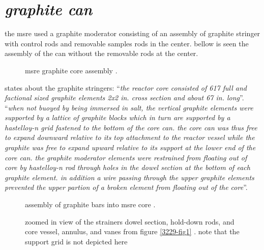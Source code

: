 \documentclass[ms,a4paper]{memoir}
\newcommand*{\mrsarchive}{../../msr-archive}%
\begin{document}
\section{\emph{graphite can}}
the msre used a graphite moderator consisting of an assembly of graphite stringer with control rods and removable samples rods in the center. bellow is seen the assembly of the can without the removable rods at the center.
\begin{figure}[H]
  \centering
  \caption{msre graphite core assembly \parencite{ornl}.}
  \label{core-assembly}
\end{figure}
\textcite[page 112 and 114]{ornl-tm-3039} states about the graphite stringers: \enquote{\textit{the reactor core consisted of 617 full and factional sized graphite elements 2x2 in. cross section and about 67 in. long}}. \enquote{\textit{when not buoyed by being immersed in salt, the vertical graphite elements were supported by a lattice of graphite blocks which in turn are supported by a hastelloy-n grid fastened to the bottom of the core can. the core can was thus free to expand downward relative to its top attachment to the reactor vessel while the graphite was free to expand upward relative to its support at the lower end of the core can. the graphite moderator elements were restrained from floating out of core by hastelloy-n rod through holes in the dowel section at the bottom of each graphite element. in addition a wire passing through the upper graphite elements prevented the upper partion of a broken element from floating out of the core}}.

\begin{figure}[H]
  \centering
  \caption{assembly of graphite bars into msre core \parencite[figure 40]{ornl-3708}.}
\end{figure}

\begin{figure}[H]
  \centering
  \caption{zoomed in view of the strainers dowel section, hold-down rods, and core vessel, annulus, and vanes from figure \ref{3229-fig1} \parencite[figure 1]{ornl-tm-3229}. note that the support grid is not depicted here}
\end{figure}
\end{document}
